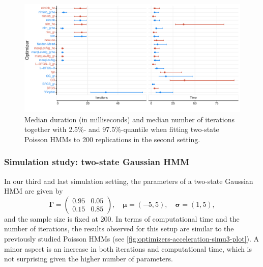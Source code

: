 \documentclass[]{interact}\usepackage[]{graphicx}\usepackage[dvipsnames]{xcolor}
\makeatletter
\def\maxwidth{ %
  \ifdim\Gin@nat@width>\linewidth
    \linewidth
  \else
    \Gin@nat@width
  \fi
}
\newenvironment{knitrout}{}{} %
\theoremstyle{plain}%
\theoremstyle{definition}
\theoremstyle{remark}
\makeatother
\begin{document}
\begin{knitrout}
\color{fgcolor}\begin{figure}[htb]

{\centering \includegraphics[width=\maxwidth]{figure/optimizers-acceleration-simu1-plot-1} 

}

\caption[Median duration (in milliseconds) and median number of iterations together with 2.5\%- and 97.5\%-quantile when fitting two-state Poisson HMMs to 200 replications in the second setting]{Median duration (in milliseconds) and median number of iterations together with 2.5\%- and 97.5\%-quantile when fitting two-state Poisson HMMs to 200 replications in the second setting.}\label{fig:optimizers-acceleration-simu1-plot}
\end{figure}

\end{knitrout}



\subsubsection{Simulation study: two-state Gaussian HMM} %
\label{results-simu3}

\noindent In our third and last simulation setting, the parameters of a two-state Gaussian HMM are given by
\begin{equation*}
\bm{\Gamma} = \begin{pmatrix} 0.95 & 0.05 \\ 0.15 & 0.85 \end{pmatrix}, \quad
\bm{\mu} = (-5, 5), \quad
\bm{\sigma} = (1, 5), 
\end{equation*}
and the sample size is fixed at 200. In terms of computational time and the number of iterations, the results observed for this setup are similar to the previously studied Poisson HMMs (see \autoref{fig:optimizers-acceleration-simu3-plot}). A minor aspect is an increase in both iterations and computational time, which is not surprising given the higher number of parameters.
\end{document}
